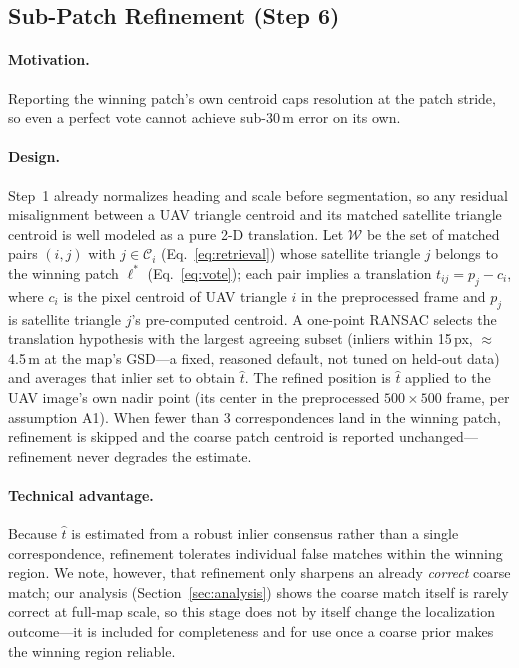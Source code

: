 \documentclass[10pt]{article}
\theoremstyle{plain}
\theoremstyle{definition}
\begin{document}
\subsection{Sub-Patch Refinement (Step 6)}
\label{sec:refine}

\paragraph{Motivation.}
Reporting the winning patch's own centroid caps resolution at the patch
stride, so even a perfect vote cannot achieve sub-30\,m error on its own.

\paragraph{Design.}
Step~1 already normalizes heading and scale before segmentation, so any
residual misalignment between a UAV triangle centroid and its matched
satellite triangle centroid is well modeled as a pure 2-D translation.
Let $\mathcal{W}$ be the set of matched pairs $(i,j)$ with $j \in \mathcal{C}_i$
(Eq.~\eqref{eq:retrieval}) whose satellite triangle $j$ belongs to the
winning patch $\ell^*$ (Eq.~\eqref{eq:vote}); each pair implies a translation
$t_{ij} = p_j - c_i$, where $c_i$ is the pixel centroid of UAV triangle $i$
in the preprocessed frame and $p_j$ is satellite triangle $j$'s pre-computed
centroid.
A one-point RANSAC selects the translation hypothesis with the largest
agreeing subset (inliers within 15\,px, $\approx$4.5\,m at the map's GSD---a
fixed, reasoned default, not tuned on held-out data) and averages that
inlier set to obtain $\hat{t}$.
The refined position is $\hat{t}$ applied to the UAV image's own nadir point
(its center in the preprocessed $500{\times}500$ frame, per assumption A1).
When fewer than 3 correspondences land in the winning patch, refinement is
skipped and the coarse patch centroid is reported unchanged---refinement
never degrades the estimate.

\paragraph{Technical advantage.}
Because $\hat{t}$ is estimated from a robust inlier consensus rather than a
single correspondence, refinement tolerates individual false matches within the
winning region. We note, however, that refinement only sharpens an already
\emph{correct} coarse match; our analysis (Section~\ref{sec:analysis}) shows the
coarse match itself is rarely correct at full-map scale, so this stage does not
by itself change the localization outcome---it is included for completeness and
for use once a coarse prior makes the winning region reliable.
\end{document}
